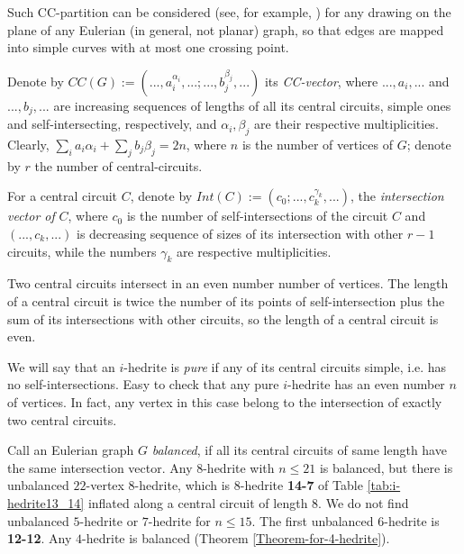 \documentclass[12pt]{article}
\begin{document}
Such CC-partition can be considered (see, for example, \cite{Ha}) for any 
drawing on the plane of any Eulerian (in general, not planar) graph, so that 
edges are mapped into simple curves with at most one crossing point. 


Denote by 
$CC(G):=(...,a_i^{\alpha_i},...;...,b_j^{\beta_j},...)$ its {\it CC-vector}, 
where $...,a_i,...$ and  $...,b_j,...$ are increasing sequences of lengths of 
all its central circuits, simple ones and self-intersecting, respectively, 
and $\alpha_i, \beta_j$ are their respective multiplicities.
Clearly, $\sum_{i} a_i{\alpha_i}+ \sum_{j} b_j{\beta_j}=2n$, where 
$n$ is the number of vertices of $G$; denote by $r$ the number of 
central-circuits.


For a central circuit $C$, denote by $Int(C):=(c_0;...,c_k^{\gamma_k},...)$,
the {\em intersection vector of} $C$, where $c_0$ is
the number of self-intersections of the circuit $C$ and $(...,c_k,...)$ is
decreasing sequence of sizes of its intersection with other $r-1$ 
circuits, while the numbers $\gamma_k$ are respective multiplicities.


Two central circuits intersect in an even number number of vertices. 
The length of a central circuit is twice the number of its points of 
self-intersection plus the sum of its intersections with other circuits, 
so the length of a central circuit is even.



We will say that an $i$-hedrite is {\it pure} if any of its central circuits 
simple, i.e. has no self-intersections.
Easy to check that any pure $i$-hedrite has an even number $n$ of 
vertices. In fact, any vertex in this case belong to the intersection 
of exactly two central circuits.


Call an Eulerian graph $G$ {\it balanced}, if all its central circuits of
same length have the same intersection vector.
Any $8$-hedrite with $n \le 21$ is balanced, but there is unbalanced
$22$-vertex $8$-hedrite, which is $8$-hedrite {\bf 14-7} of Table 
\ref{tab:i-hedrite13_14} inflated along a central circuit of length $8$.
We do not find unbalanced $5$-hedrite or $7$-hedrite for $n\leq 15$. The
first unbalanced $6$-hedrite is {\bf 12-12}. Any $4$-hedrite is balanced
(Theorem \ref{Theorem-for-4-hedrite}).
\end{document}
